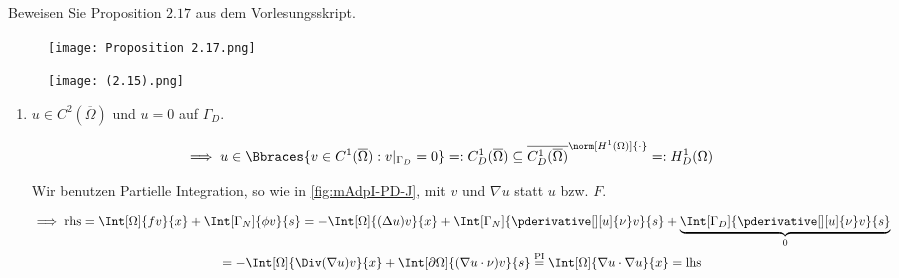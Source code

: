 
\begin{exercise}

Beweisen Sie Proposition $2.17$ aus dem Vorlesungsskript.

\end{exercise}


\begin{solution}

\phantom{}

\begin{figure}[h!]
    \centering
    \texttt{[image: Proposition 2.17.png]}
\end{figure}

\begin{figure}[h!]
    \centering
    \texttt{[image: (2.15).png]}
\end{figure}

\begin{enumerate}[label = (\roman*)]

    \item $u \in C^2(\overline{\Omega})$ und $u = 0$ auf $\Gamma_D$.

    \begin{align*}
        \implies
        u
        \in
        \Bbraces{v \in C^1(\overline{\Omega}): v|_{\Gamma_D} = 0}
        =:
        C_D^1(\overline{\Omega})
        \subseteq
        \overline
        {
            C_D^1(\overline{\Omega})
        }^{
            \norm[H^1(\Omega)]{\cdot}
        }
        =:
        H^1_D(\Omega)
    \end{align*}


    Wir benutzen Partielle Integration, so wie in \ref{fig:mAdpI-PD-J}, mit $v$ und $\nabla u$ statt $u$ bzw. $F$.

    \begin{multline*}
        \implies
        \text{rhs}
        =
        \Int[\Omega]{f v}{x}
        +
        \Int[\Gamma_N]{\phi v}{s}
        =
        -\Int[\Omega]{(\Delta u) v}{x}
        +
        \Int[\Gamma_N]{\pderivative[][u]{\nu} v}{s}
        +
        \underbrace
        {
            \Int[\Gamma_D]{\pderivative[][u]{\nu} v}{s}
        }_0 \\
        =
        -\Int[\Omega]{\Div(\nabla u) v}{x}
        +
        \Int[\partial \Omega]{(\nabla u \cdot \nu) v}{s}
        \stackrel{\text{PI}}{=}
        \Int[\Omega]{\nabla u \cdot \nabla u}{x}
        =
        \text{lhs}
    \end{multline*}


\end{enumerate}
\end{solution}
